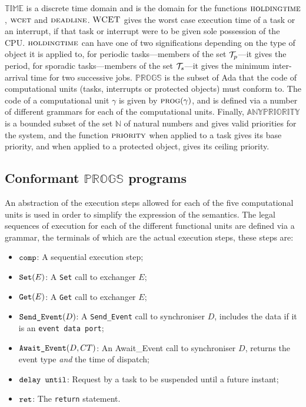 $\scriptstyle \mathbb{TIME}$ is a discrete time domain and is the
domain for the functions $\text{\scshape holdingtime}$,
$\text{\scshape wcet}$ and $\text{\scshape deadline}$. $\text{\scshape
  WCET}$ gives the worst case execution time of a task or an
interrupt, if that task or interrupt were to be given sole possession
of the CPU. $\text{\scshape holdingtime}$ can have one of two
significations depending on the type of object it is applied to, for
periodic tasks---members of the set ${\cal T}_p$---it gives the
period, for sporadic tasks---members of the set ${\cal T}_s$---it
gives the minimum inter-arrival time for two successive
jobs. $\scriptstyle \mathbb{PROGS}$ is the subset of Ada that the code
of computational units (tasks, interrupts or protected objects) must
conform to. The code of a computational unit $\gamma$ is given by
$\text{\scshape prog}(\gamma)$, and is defined via a number of
different grammars for each of the computational units. Finally,
$\scriptstyle \mathbb{ANYPRIORITY}$ is a bounded subset of the set
$\mathbb{N}$ of natural numbers and gives valid priorities for the
system, and the function $\text{\scshape priority}$ when applied to a
task gives its base priority, and when applied to a protected object,
gives its ceiling priority.

\subsection{Conformant ${\scriptstyle \mathbb{PROGS}}$ programs}
An abstraction of the execution steps allowed for each of the five
computational units is used in order to simplify the expression of the
semantics. The legal sequences of execution for each of the different
functional units are defined via a grammar, the terminals of which
are the actual execution steps, these steps are:

\begin{itemize} 
  \item ${\text{\ttfamily comp}}$: A sequential execution step;
  \item ${\text{\ttfamily Set}}(E)$: A \texttt{Set} call to exchanger
    $E$;
  \item ${\text{\ttfamily Get}}(E)$: A \texttt{Get} call to exchanger
    $E$; 
  \item ${\text{\ttfamily Send\_Event}}(D)$: A \texttt{Send\_Event}
    call to synchroniser $D$, includes the data if it is an
    \texttt{event data port}; 
  \item ${\text{\ttfamily Await\_Event}}(D, CT)$: An Await\_Event call
    to synchroniser $D$, returns the event type \emph{and} the time of
    dispatch;
  \item ${\text{\ttfamily delay until}}$: Request by a task to be
    suspended until a future instant;
  \item ${\text{\ttfamily ret}}$: The \texttt{return} statement.
\end{itemize}

